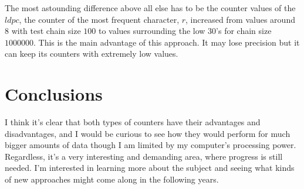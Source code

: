 \documentclass[...]{revdetua}
\begin{document}
The most astounding difference above all else has to be the counter values of the $ldpc$, the counter of the most frequent character, $r$, increased from values around $8$ with test chain size $100$ to values surrounding the low $30$'s for chain size $1000000$. This is the main advantage of this approach. It may lose precision but it can keep its counters with extremely low values.
\section{Conclusions}
I think it's clear that both types of counters have their advantages and disadvantages, and I would be curious to see how they would perform for much bigger amounts of data though I am limited by my computer's processing power.
Regardless, it's a very interesting and demanding area, where progress is still needed. I'm interested in learning more about the subject and seeing what kinds of new approaches might come along in the following years.




\end{document}
